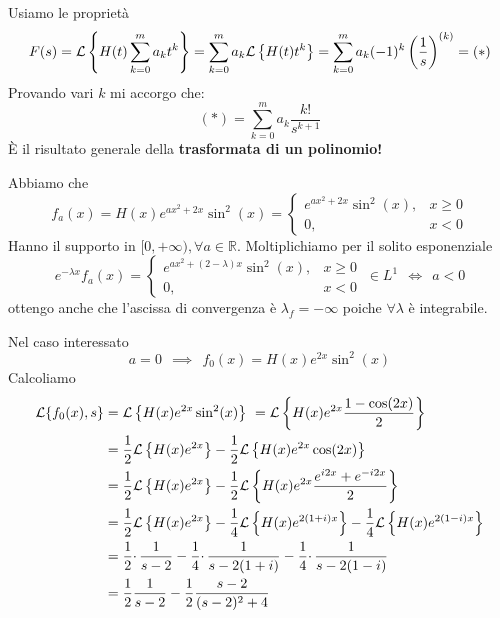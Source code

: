 Usiamo le proprietà
\begin{equation*}
F( s) =\mathcal{L}\left\{H( t)\sum ^{m}_{k=0} a_{k} t^{k}\right\} =\sum ^{m}_{k=0} a_{k}\mathcal{L}\left\{H( t) t^{k}\right\} =\sum ^{m}_{k=0} a_{k}( -1)^{k}\left(\frac{1}{s}\right)^{( k)} =( *)
\end{equation*}
Provando vari $\displaystyle k$ mi accorgo che:
\begin{equation*}
( *) =\sum ^{m}_{k=0} a_{k}\frac{k!}{s^{k+1}}
\end{equation*}
È il risultato generale della \textbf{trasformata di un polinomio!}
\Soluzione

Abbiamo che
\begin{equation*}
f_{a}( x) =H( x) e^{ax^{2} +2x}\sin^{2}( x) =\begin{cases}
e^{ax^{2} +2x}\sin^{2}( x) , & x\geqslant 0\\
0, & x< 0
\end{cases}
\end{equation*}
Hanno il supporto in $\displaystyle [ 0,+\infty ) ,\forall a\in \mathbb{R}$. Moltiplichiamo per il solito esponenziale
\begin{equation*}
e^{-\lambda x} f_{a}( x) =\begin{cases}
e^{ax^{2} +( 2-\lambda ) x}\sin^{2}( x) , & x\geqslant 0\\
0, & x< 0
\end{cases} \ \in L^{1} \ \ \iff \ \ a< 0
\end{equation*}
ottengo anche che l'ascissa di convergenza è $\displaystyle \lambda _{f} =-\infty $ poiche $\displaystyle \forall \lambda $ è integrabile.

Nel caso interessato
\begin{equation*}
a=0\ \ \implies \ \ f_{0}( x) =H( x) e^{2x}\sin^{2}( x)
\end{equation*}
Calcoliamo
\begin{align*}
\Lc\{f_{0}( x) ,s\} & =\Lc\left\{H( x) e^{2x}\sin^{2}( x)\right\} \ =\Lc\left\{H( x) e^{2x}\frac{1-\cos( 2x)}{2}\right\}\\
 & =\frac{1}{2}\Lc\left\{H( x) e^{2x}\right\} -\frac{1}{2}\Lc\left\{H( x) e^{2x}\cos( 2x)\right\}\\
 & =\frac{1}{2}\Lc\left\{H( x) e^{2x}\right\} -\frac{1}{2}\Lc\left\{H( x) e^{2x}\frac{e^{i2x} +e^{-i2x}}{2}\right\}\\
 & =\frac{1}{2}\Lc\left\{H( x) e^{2x}\right\} -\frac{1}{4}\Lc\left\{H( x) e^{2( 1+i) x}\right\} -\frac{1}{4}\Lc\left\{H( x) e^{2( 1-i) x}\right\}\\
 & =\frac{1}{2} \cdotp \frac{1}{s-2} -\frac{1}{4} \cdotp \frac{1}{s-2( 1+i)} -\frac{1}{4} \cdotp \frac{1}{s-2( 1-i)}\\
 & =\frac{1}{2}\frac{1}{s-2} -\frac{1}{2}\frac{s-2}{( s-2)^{2} +4}
\end{align*}
\Soluzione

